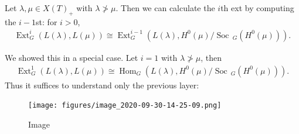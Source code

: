 \begin{proposition}[?]

\begin{proposition}[?]

Let \(\lambda, \mu \in X(T)_+\) with \(\lambda \not> \mu\). Then we can
calculate the \(i\)th ext by computing the \(i-1\)st: for \(i>0\),
\begin{align*}   \operatorname{Ext}^i_G(L(\lambda), L(\mu)) \cong \operatorname{Ext}^{i-1}_G(L(\lambda), H^0(\mu) / \operatorname{Soc}\,_G(H^0(\mu))) .\end{align*}

\end{proposition}

\end{proposition}

\begin{remark}

\begin{remark}

We showed this in a special case. Let \(i=1\) with
\(\lambda \not> \mu\), then
\begin{align*}   \operatorname{Ext}_G^1(L(\lambda), L(\mu)) \cong {\operatorname{Hom}}_G(L(\lambda), H^0(\mu) / \operatorname{Soc}\,_G(H^0(\mu))) .\end{align*}
Thus it suffices to understand only the previous layer:

\begin{figure}
\centering
\texttt{[image: figures/image\_2020-09-30-14-25-09.png]}
\caption{Image}
\end{figure}

\end{remark}

\end{remark}

